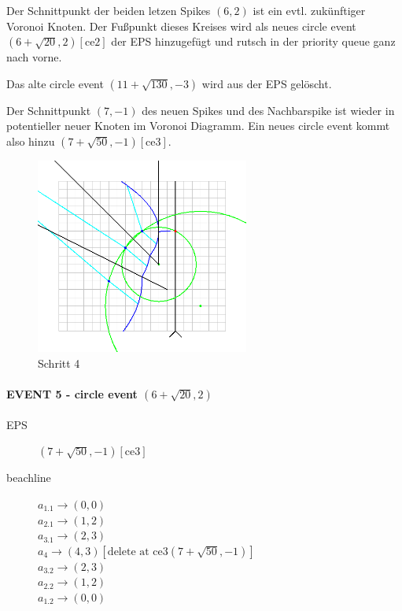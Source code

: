 Der Schnittpunkt der beiden letzen Spikes $(6,2)$ ist ein evtl. zukünftiger Voronoi Knoten. Der Fußpunkt dieses Kreises wird als neues circle event  $(6 + \sqrt{20}, 2)[\text{ce2}]$ der EPS hinzugefügt und rutsch in der priority queue ganz nach vorne.

Das alte circle event $(11 + \sqrt{130}, -3)$ wird aus der EPS gelöscht.

Der Schnittpunkt $(7, -1)$ des neuen Spikes und des Nachbarspike ist wieder in potentieller neuer Knoten im Voronoi Diagramm. Ein neues circle event kommt also hinzu $(7 + \sqrt{50}, -1)[\text{ce3}]$.

\begin{figure}[h]
\begin{center}
\includegraphics[width=7cm]{capture4}
\end{center}
\caption{Schritt 4}
\label{fig:c4}
\end{figure}

\newpage

\paragraph*{EVENT 5 - circle event $(6 + \sqrt{20}, 2)$}
\begin{description}
\item[EPS] $(7 + \sqrt{50}, -1)[\text{ce3}]$
\item[beachline]
$a_{1.1} \rightarrow (0,0)$\\
$a_{2.1} \rightarrow (1,2)$\\
$a_{3.1} \rightarrow (2,3)$\\
$a_4 \rightarrow (4,3)[\text{delete at ce3} (7 + \sqrt{50}, -1)]$\\
$a_{3.2} \rightarrow (2,3)$\\
$a_{2.2} \rightarrow (1,2)$\\
$a_{1.2} \rightarrow (0,0)$
\end{description}

